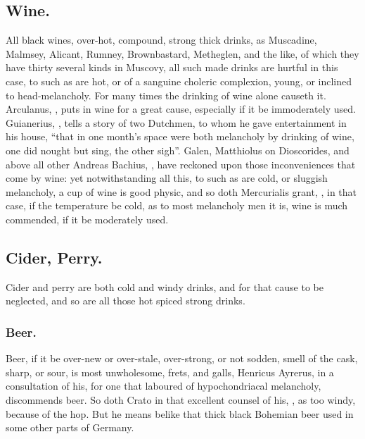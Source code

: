 \subsection{Wine.}

All black wines, over-hot, compound, strong thick drinks, as Muscadine,
Malmsey, Alicant, Rumney, Brownbastard, Metheglen, and the like, of which they
have thirty several kinds in Muscovy, all such made drinks are hurtful in this
case, to such as are hot, or of a sanguine choleric complexion, young, or
inclined to head-melancholy. For many times the drinking of wine alone causeth
it. Arculanus, , puts in
wine for a great cause, especially if it be immoderately
used. Guianerius, , tells a story of two
Dutchmen, to whom he gave entertainment in his house, \enquote{that
in one month's space were both melancholy by drinking of
wine, one did nought but sing, the other sigh}. Galen,  Matthiolus on Dioscorides, and above all other Andreas
Bachius, , have reckoned upon those
inconveniences that come by wine: yet notwithstanding all this, to such as are
cold, or sluggish melancholy, a cup of wine is good physic, and so doth
Mercurialis grant, , in that case, if the
temperature be cold, as to most melancholy men it is, wine is much commended,
if it be moderately used.

\subsection{Cider, Perry.}

Cider and perry are both cold and windy drinks, and for that cause to be
neglected, and so are all those hot spiced strong drinks.

\subsubsection{Beer.}

Beer, if it be over-new or over-stale, over-strong, or not sodden, smell of the
cask, sharp, or sour, is most unwholesome, frets, and galls, \etc{} Henricus
Ayrerus, in a consultation of his, for one that laboured
of hypochondriacal melancholy, discommends beer. So doth
Crato in that excellent counsel of his,
, as too windy, because of the hop.
But he means belike that thick black Bohemian beer used in some other parts of
Germany.

